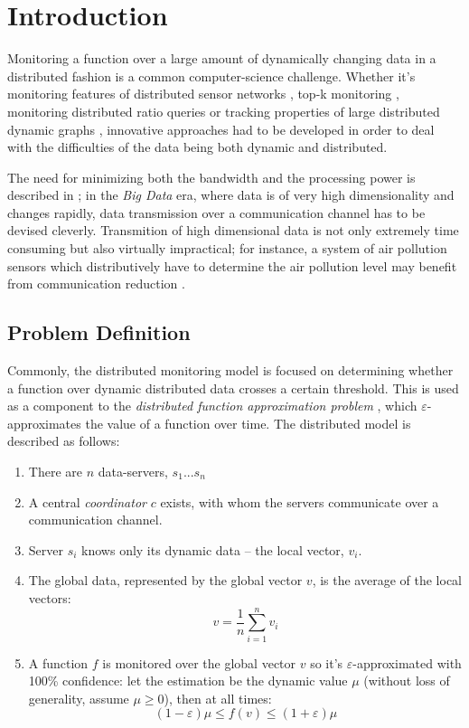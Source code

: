 \documentclass[11pt, conference]{article}
\begin{document}
\section{Introduction}

Monitoring a function over a large amount of dynamically changing data in a distributed fashion is a common computer-science challenge. Whether it's monitoring features of distributed sensor networks \cite{burdakis2012detecting}, top-k monitoring \cite{babcock2003distributed}, monitoring distributed ratio queries \cite{gupta2013ratio} or tracking properties of large distributed dynamic graphs \cite{mcgregor2015densest}, innovative approaches had to be developed in order to deal with the difficulties of the data being both dynamic and distributed.

The need for minimizing both the bandwidth and the processing power is described in \cite{giatrakos2013network}; in the \textit{Big Data} era, where data is of very high dimensionality and changes rapidly, data transmission over a communication channel has to be devised cleverly. Transmition of high dimensional data is not only extremely time consuming but also virtually impractical; for instance, a system of air pollution sensors which distributively have to determine the air pollution level may benefit from communication reduction \cite{cheng2004revised}.

\subsection{Problem Definition}

Commonly, the distributed monitoring model is focused on determining whether a function over dynamic distributed data crosses a certain threshold. This is used as a component to the \textit{distributed function approximation problem} \cite{garofalakis2013sketch}, which $\varepsilon$-approximates the value of a function over time. The distributed model is described as follows:
\begin{enumerate}
\item There are $n$ data-servers, $s_1 ... s_n$
\item A central \textit{coordinator} $c$ exists, with whom the servers communicate over a communication channel.
\item Server $s_i$ knows only its dynamic data -- the local vector, $v_i$.
\item The global data, represented by the global vector $v$, is the average of the local vectors:
\begin{equation}
v = \frac{1}{n}\sum\limits_{i=1}^n {v_i}
\end{equation}
\item A function $f$ is monitored over the global vector $v$ so it's $\varepsilon$-approximated with 100\% confidence: let the estimation be the dynamic value $\mu$ (without loss of generality, assume ${\mu \geq 0}$), then at all times: 
\begin{equation}
(1-\varepsilon )\mu \leq f(v) \leq (1+\varepsilon )\mu
\end{equation}
\end{enumerate}
\end{document}
